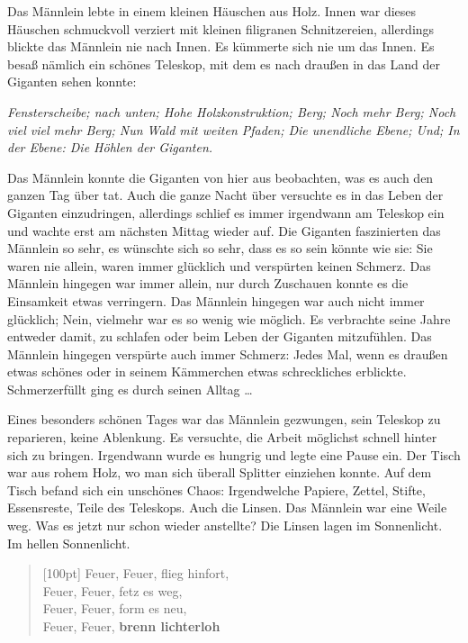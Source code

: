 \documentclass{article}
\title{\vspace{-2cm}\titlevar}
\author{\authorvar}
\date{\datevar}
\begin{document}
	\maketitle
	 
	Das Männlein lebte in einem kleinen Häuschen aus Holz. Innen war dieses Häuschen schmuckvoll verziert mit kleinen filigranen Schnitzereien, allerdings blickte das Männlein nie nach Innen. Es kümmerte sich nie um das Innen. Es besaß nämlich ein schönes Teleskop, mit dem es nach draußen in das Land der Giganten sehen konnte:  
	
	\textit{Fensterscheibe; nach unten; Hohe Holzkonstruktion; Berg; Noch mehr Berg; Noch viel viel mehr Berg; Nun Wald mit weiten Pfaden; Die unendliche Ebene; Und; In der Ebene: Die Höhlen der Giganten.}
	
	Das Männlein konnte die Giganten von hier aus beobachten, was es auch den ganzen Tag über tat. Auch die ganze Nacht über versuchte es in das Leben der Giganten einzudringen, allerdings schlief es immer irgendwann am Teleskop ein und wachte erst am nächsten Mittag wieder auf. Die Giganten faszinierten das Männlein so sehr, es wünschte sich so sehr, dass es so sein könnte wie sie: Sie waren nie allein, waren immer glücklich und verspürten keinen Schmerz. Das Männlein hingegen war immer allein, nur durch Zuschauen konnte es die Einsamkeit etwas verringern. Das Männlein hingegen war auch nicht immer glücklich; Nein, vielmehr war es so wenig wie möglich. Es verbrachte seine Jahre entweder damit, zu schlafen oder beim Leben der Giganten mitzufühlen. Das Männlein hingegen verspürte auch immer Schmerz: Jedes Mal, wenn es draußen etwas schönes oder in seinem Kämmerchen etwas schreckliches erblickte. Schmerzerfüllt ging es durch seinen Alltag \dots
	 
	Eines besonders schönen Tages war das Männlein gezwungen, sein Teleskop zu reparieren, keine Ablenkung. Es versuchte, die Arbeit möglichst schnell hinter sich zu bringen. Irgendwann wurde es hungrig und legte eine Pause ein. Der Tisch war aus rohem Holz, wo man sich überall Splitter einziehen konnte. Auf dem Tisch befand sich ein unschönes Chaos: Irgendwelche Papiere, Zettel, Stifte, Essensreste, Teile des Teleskops. Auch die Linsen. Das Männlein war eine Weile weg. Was es jetzt nur schon wieder anstellte? Die Linsen lagen im Sonnenlicht. Im hellen Sonnenlicht.  
	
	\begin{verse}[100pt]
		Feuer, Feuer, flieg hinfort,  \\
		Feuer, Feuer, fetz es weg, \\ 
		Feuer, Feuer, form es neu, \\
		Feuer, Feuer, \textbf{brenn lichterloh\!}
	\end{verse}
	
\end{document}
